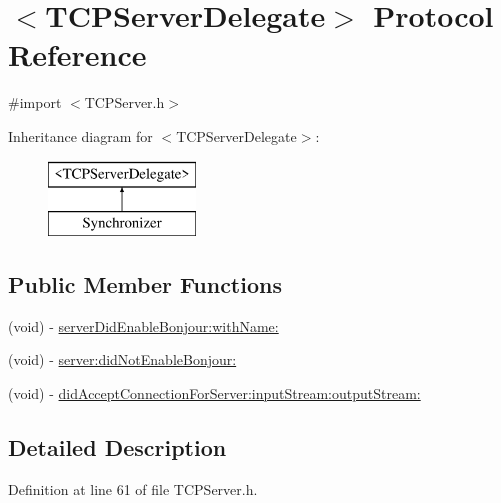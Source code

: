 \hypertarget{protocol_t_c_p_server_delegate-p}{
\section{$<$TCPServerDelegate$>$ Protocol Reference}
\label{protocol_t_c_p_server_delegate-p}
}


{\ttfamily \#import $<$TCPServer.h$>$}

Inheritance diagram for $<$TCPServerDelegate$>$:\begin{figure}[H]
\begin{center}
\leavevmode
\includegraphics[height=2.000000cm]{protocol_t_c_p_server_delegate-p}
\end{center}
\end{figure}
\subsection*{Public Member Functions}
\begin{DoxyCompactItemize}
\item 
(void) -\/ \hyperlink{protocol_t_c_p_server_delegate-p_acc0491f690db167abf8d776edda8a026}{serverDidEnableBonjour:withName:}
\item 
(void) -\/ \hyperlink{protocol_t_c_p_server_delegate-p_a850cb2ce60e3121effb7f93087669097}{server:didNotEnableBonjour:}
\item 
(void) -\/ \hyperlink{protocol_t_c_p_server_delegate-p_a4d30e6d8dab68bde9d295209db2ab492}{didAcceptConnectionForServer:inputStream:outputStream:}
\end{DoxyCompactItemize}


\subsection{Detailed Description}


Definition at line 61 of file TCPServer.h.



